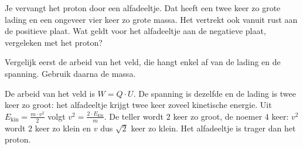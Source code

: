 \documentclass{ximera}
\begin{document}
\begin{exercise}
    \begin{question}
        Je vervangt het proton door een alfadeeltje. Dat heeft een twee keer zo grote lading en een ongeveer vier keer zo grote massa. Het vertrekt ook vanuit rust aan de positieve plaat. Wat geldt voor het alfadeeltje aan de negatieve plaat, vergeleken met het proton?

        \begin{multipleChoice}
        \end{multipleChoice}

        \begin{hint}
            Vergelijk eerst de arbeid van het veld, die hangt enkel af van de lading en de spanning. Gebruik daarna de massa.
        \end{hint}

        \begin{solution}\nl
            De arbeid van het veld is $W = Q \cdot U$. De spanning is dezelfde en de lading is twee keer zo groot: het alfadeeltje krijgt twee keer zoveel kinetische energie. Uit $E_{\text{kin}} = \frac{m \cdot v^2}{2}$ volgt $v^2 = \frac{2 \cdot E_{\text{kin}}}{m}$. De teller wordt $2$ keer zo groot, de noemer $4$ keer: $v^2$ wordt $2$ keer zo klein en $v$ dus $\sqrt{2}$ keer zo klein. Het alfadeeltje is trager dan het proton.
        \end{solution}
    \end{question}
\end{exercise}
\end{document}
